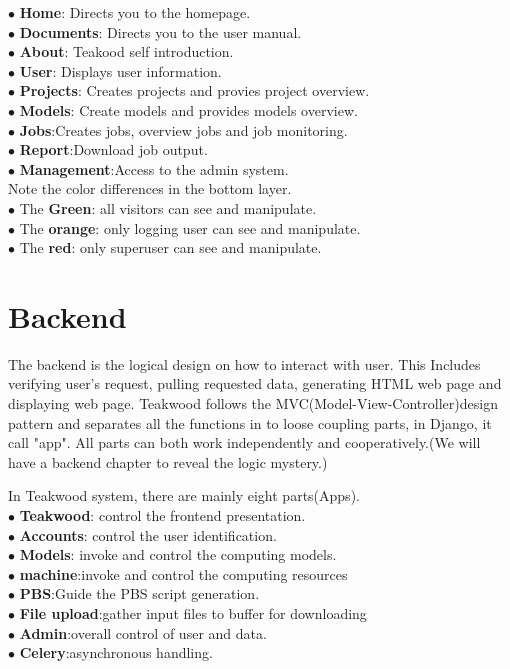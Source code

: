 $\bullet$ \textbf{Home}: Directs you to the homepage.\\
$\bullet$ \textbf{Documents}: Directs you to the user manual.\\
$\bullet$ \textbf{About}: Teakood self introduction.\\
$\bullet$ \textbf{User}: Displays user information.\\
$\bullet$ \textbf{Projects}: Creates projects and provies project overview.\\
$\bullet$ \textbf{Models}: Create models and provides models overview.\\
$\bullet$ \textbf{Jobs}:Creates jobs, overview jobs and job monitoring.\\
$\bullet$ \textbf{Report}:Download job output.\\
$\bullet$ \textbf{Management}:Access to the admin system.\\


Note the color differences in the bottom layer.\\

$\bullet$ The \textbf{Green}: all visitors can see and manipulate.\\
$\bullet$ The \textbf{orange}: only logging user can see and manipulate.\\
$\bullet$ The \textbf{red}: only superuser can see and manipulate.\\


\section{Backend}
The backend is the logical design on how to interact with user. This Includes verifying user's request, pulling requested data, generating HTML web page and displaying web page. Teakwood follows the MVC(Model-View-Controller)design pattern and separates all the functions in to loose coupling parts, in Django, it call "app". All parts can both work independently and cooperatively.(We will have a backend chapter to reveal the logic mystery.)

In Teakwood system, there are mainly eight parts(Apps).\\

$\bullet$ \textbf{Teakwood}: control the frontend presentation.\\
$\bullet$ \textbf{Accounts}: control the user identification.\\
$\bullet$ \textbf{Models}: invoke and control the computing models.\\
$\bullet$ \textbf{machine}:invoke and control the computing resources\\
$\bullet$ \textbf{PBS}:Guide the PBS script generation.\\
$\bullet$ \textbf{File upload}:gather input files to buffer for downloading \\
$\bullet$ \textbf{Admin}:overall control of user and data.\\
$\bullet$ \textbf{Celery}:asynchronous handling.\\

